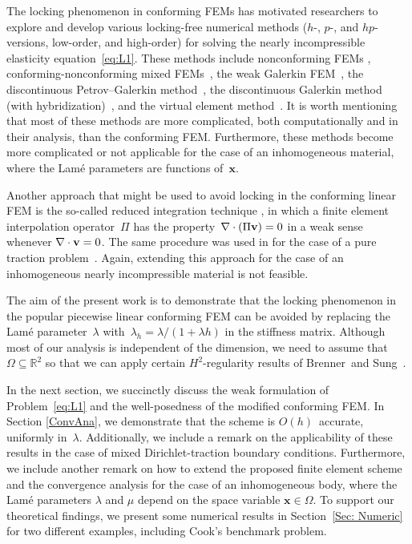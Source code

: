 \documentclass[11pt]{article}
\newcommand{\vv}{{\bf v}}
\newcommand{\bsx}{{\boldsymbol{x}}}
\numberwithin{equation}{section}
\begin{document}
The locking phenomenon in conforming FEMs has motivated researchers to explore
and develop various  locking-free numerical methods ($h$-, $p$-, and
$hp$-versions, low-order, and high-order) for solving the nearly incompressible
elasticity equation~\eqref{eq:L1}. These methods include  nonconforming FEMs
\cite{ArnoldAwanouWinther2014,BrennerSung1992,ChenRenMao2010,Falk1991,
LeeLeeSheen2003,MaoChen2008,YangChen2010}, conforming-nonconforming mixed
FEMs~\cite{BoffiBrezziFortin2013,
GopalakrishnanGuzman2011,HuShi2008,ZhangZhaoChenYang2018}, the weak Galerkin
FEM~\cite{ChenXie2016,
HuoWangWangZhang2020,HuoWangWangZhang2023,LiuWang2022,WangWangWangZhang2016},
the discontinuous Petrov--Galerkin
method~\cite{BramwellDemkowiczGopalakrishnanQiu2012}, the discontinuous Galerkin
method (with hybridization)~\cite{CockburnSchotzauWang2006,DiPietroNicaise2013,
HansboLarson2002,SoonCockburnStolarski2009,Wihler2006}, and the virtual element
 method~\cite{EdoardoStefanoCarloLuca2020,HuangLinYu2022,VeigaBrezziMarini2013,
ZhangZhaoYangChen2019,ZhaoWangZhang2022}.  It is worth mentioning that most of
these methods are more complicated, both computationally and in their analysis,
than the conforming FEM. Furthermore, these methods become more complicated or
not applicable for the case of an inhomogeneous material, where the Lam\'e
parameters are functions of~$\bsx$.

{\color{red}  Another approach that might be used to avoid locking in the
conforming linear FEM is the so-called reduced integration technique
\cite{HughesCohenHaroun1978,MalkusHughes1978}, in which a finite element
interpolation operator~$\Pi$ has the property~$\nabla\cdot(\Pi \vv)=0$ in
a weak sense whenever $\nabla\cdot\vv=0$.  The same procedure was used in
for the case of a pure traction problem~\cite{BrennerSung1992}. Again,
extending this approach for the case of an inhomogeneous nearly incompressible
material is not feasible.}

The aim of the present work is to demonstrate that the locking phenomenon in
the popular piecewise linear conforming FEM can be avoided by replacing
the Lam\'e parameter~$\lambda$ with~$\lambda_h=\lambda/(1+\lambda h)$ in the
stiffness matrix.  Although most of our analysis is independent of the
dimension, we need to assume that $\Omega\subseteq\mathbb{R}^2$ so that we can
apply certain $H^2$-regularity results
of Brenner~and Sung~\cite{BrennerSung1992}.

In the next section, we succinctly discuss the weak formulation of Problem~\eqref{eq:L1} and the well-posedness of the modified conforming FEM. In Section \ref{ConvAna}, we demonstrate that the 
scheme is $O(h)$~accurate, uniformly in~$\lambda$. Additionally, we include a remark on the applicability of these results in the case of mixed Dirichlet-traction boundary conditions. Furthermore, we include another remark on how to extend the proposed finite element scheme and the convergence analysis for the case of an inhomogeneous body, where  the Lam\'e parameters $\lambda$ and $\mu$ depend on the space variable $\bsx \in \Omega$.  
To support our theoretical findings, we present some numerical results in Section~\ref{Sec: Numeric} for two different examples,  including Cook's benchmark problem.
\end{document}
